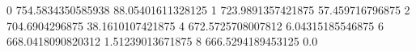 0 754.5834350585938 88.05401611328125
1 723.9891357421875 57.459716796875
2 704.6904296875 38.1610107421875
4 672.5725708007812 6.04315185546875
6 668.0418090820312 1.51239013671875
8 666.5294189453125 0.0
